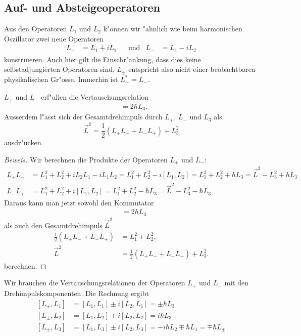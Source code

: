 \subsection{Auf- und Absteigeoperatoren}
%
%
Aus den Operatoren $L_1$ und $L_2$ k"onnen wir "ahnlich wie beim
harmonischen Oszillator zwei neue Operatoren
\begin{align*}
L_+&=L_1+iL_2
&
&\text{und}&
L_-&=L_1-iL_2
\end{align*}
konstruieren.
Auch hier gilt die Einschr"ankung, dass dies keine selbstadjungierten
Operatoren sind, $L_\pm$ entspricht also nicht einer beobachtbaren
physikalischen Gr"osse. 
Immerhin ist $L_+^*=L_-$.

\begin{hilfssatz}
$L_+$ und $L_-$ erf"ullen die Vertauschungsrelation
\begin{align*}
[L_+, L_-]&=2\hbar L_3.
\end{align*}
Ausserdem l"asst sich der Gesamtdrehimpuls durch $L_+$, $L_-$ und $L_3$ als
\[
\vec L^2 = \frac12(L_+L_- + L_-L_+)+L_3^2
\]
ausdr"ucken.
\end{hilfssatz}

\begin{proof}[Beweis]
Wir berechnen die Produkte der Operatoren $L_+$ und $L_-$:
\begin{align}
L_+L_-
&=
L_1^2+L_2^2 +iL_2L_1-iL_1L_2=L_1^2+L_2^2 -i[L_1,L_2]=L_1^2+L_2^2+\hbar L_3
=\vec L^2-L_3^2+\hbar L_3
\label{skript:l+l-}
\\
L_-L_+
&=
L_1^2  + L_2^2 +i[L_1,L_2]=L_1^2+L_2^2-\hbar L_3
=\vec L^2-L_3^2-\hbar L_3
\label{skript:l-l+}
\end{align}
Daraus kann man jetzt sowohl den Kommutator
\begin{align*}
[L_+,L_-]
&=
2\hbar L_3
\end{align*}
als auch den Gesamtdrehimpuls $\vec L^2$
\begin{align*}
{\textstyle \frac12}(L_+L_-+L_-L_+)&=L_1^2+L_2^2,
\\
\vec L^2
&=
{\textstyle\frac12}(L_+L_-+L_-L_+)+L_3^2.
\end{align*}
berechnen.
\end{proof}

Wir brauchen die Vertauschungsrelationen der Operatoren $L_+$ und $L_-$
mit den Drehimpulskomponenten.
Die Rechnung ergibt
\begin{equation}
\begin{aligned} 
\phantom{ }	%
[L_\pm, L_1]
&=
[L_1,L_1]\pm i[L_2,L_1]
=
\pm \hbar L_3
\\
[L_\pm, L_2]
&=
[L_1,L_2]\pm i[L_2,L_2]
=
i\hbar L_3
\\
[L_\pm,L_3]
&=
[L_1,L_3]\pm i[L_2,L_3]
=
-i\hbar L_2
\mp
\hbar L_1
=
\mp \hbar L_\pm
\end{aligned}
\label{skript:lpmlkommutator}
\end{equation}

